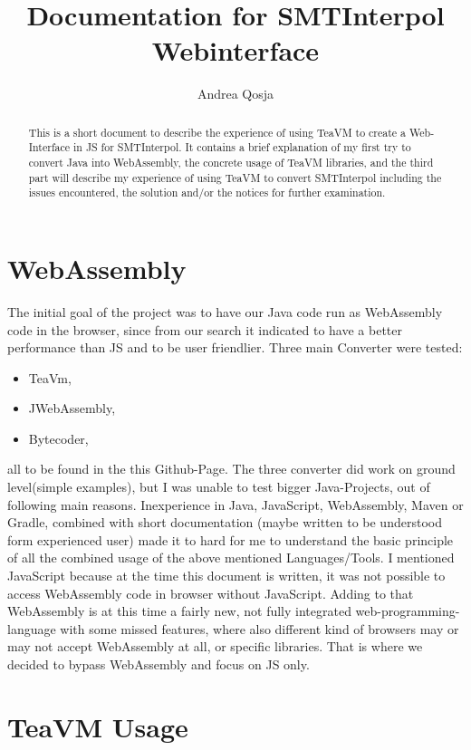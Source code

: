 \documentclass[]{article}
\title{Documentation for SMTInterpol Webinterface}
\author{Andrea Qosja}
\begin{document}
\maketitle

\begin{abstract}
This is a short document to describe the experience of using TeaVM to create a Web-Interface in JS for SMTInterpol. It contains a brief explanation of my first try to convert Java into WebAssembly, the concrete usage of TeaVM libraries, and the third part will describe my experience of using TeaVM to convert SMTInterpol including the issues encountered, the solution and/or the notices for further examination.
\end{abstract}

\section{WebAssembly}

The initial goal of the project was to have our Java code run as WebAssembly code in the browser, since from our search it indicated to have a better performance than JS and to be user friendlier. Three main Converter were tested:
\begin{itemize} 
\item[] TeaVm,
\item[] JWebAssembly,
\item[] Bytecoder,
\end{itemize}
all to be found in the this\cite{1} Github-Page.
The three converter did work on ground level(simple examples), but I was unable to test bigger Java-Projects, out of following main reasons.
Inexperience in Java, JavaScript, WebAssembly, Maven or Gradle,
combined with short documentation (maybe written to be understood form experienced user) made it to hard for me to understand the basic principle of all the combined usage of the above mentioned Languages/Tools. I mentioned JavaScript because at the time this document is written, it was not possible to access WebAssembly code in browser without JavaScript. Adding to that WebAssembly is at this time a fairly new, not fully integrated web-programming-language with some missed features, where also different kind of browsers may or may not accept WebAssembly at all, or specific libraries. That is where we decided to bypass WebAssembly and focus on JS only.

\section{TeaVM Usage}
\end{document}
